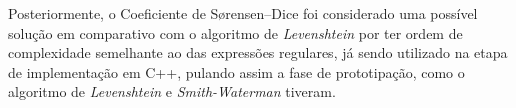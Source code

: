 Posteriormente, o Coeficiente de Sørensen–Dice foi considerado uma possível solução em comparativo com o algoritmo de \textit{Levenshtein} por ter ordem de complexidade semelhante ao das expressões regulares, já sendo utilizado na etapa de implementação em C++, pulando assim a fase de prototipação, como o algoritmo de \textit{Levenshtein} e \textit{Smith-Waterman} tiveram.